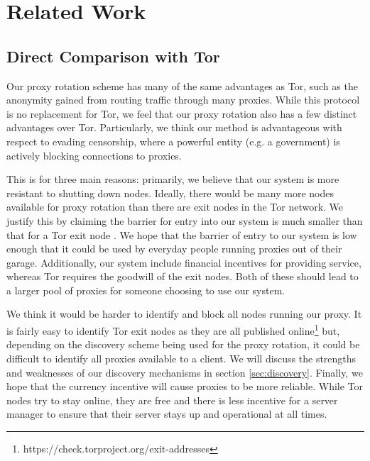 \section{Related Work}
\label{sec:related}

\subsection{Direct Comparison with Tor}

Our proxy rotation scheme has many of the same advantages as Tor, such as the anonymity gained from routing traffic through many proxies. While this protocol is no replacement for Tor, we feel that our proxy rotation also has a few distinct advantages over Tor. Particularly, we think our method is advantageous with respect to evading censorship, where a powerful entity (e.g. a government) is actively blocking connections to proxies.

This is for three main reasons: primarily, we believe that our system is more resistant to shutting down nodes. Ideally, there would be many more nodes available for proxy rotation than there are exit nodes in the Tor network. We justify this by claiming the barrier for entry into our system is much smaller than that for a Tor exit node . We hope that the barrier of entry to our system is low enough that it could be used by everyday people running proxies out of their garage.  Additionally, our system include financial incentives for providing service, whereas Tor requires the goodwill of the exit nodes. Both of these should lead to a larger pool of proxies for someone choosing to use our system.

We think it would be harder to identify and block all nodes running our proxy. It is fairly easy to identify Tor exit nodes as they are all published online\footnote{https://check.torproject.org/exit-addresses} but, depending on the discovery scheme being used for the proxy rotation, it could be difficult to identify all proxies available to a client. We will discuss the strengths and weaknesses of our discovery mechanisms in section \ref{sec:discovery}. Finally, we hope that the currency incentive will cause proxies to be more reliable. While Tor nodes try to stay online, they are free and there is less incentive for a server manager to ensure that their server stays up and operational at all times.

